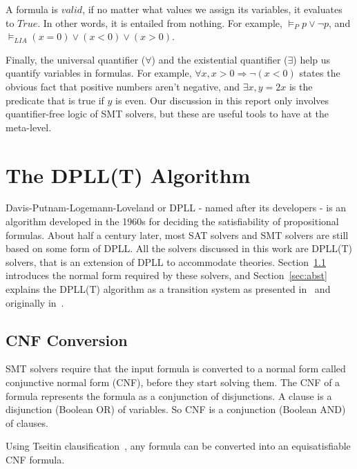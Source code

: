 \documentclass{article}
\begin{document}
A formula is $valid$, if no matter what values we assign its 
variables, it evaluates to $True$. In other words, it is
entailed from nothing. For example, $\models_P p \lor \neg p$, 
and $\models_{LIA} (x = 0) \lor (x < 0) \lor (x > 0)$.

Finally, the universal quantifier ($\forall$) and 
the existential quantifier ($\exists$) help us quantify 
variables in formulas. For example, $\forall x, x > 0 
\Rightarrow \neg (x < 0)$ states the obvious fact that 
positive numbers aren't negative, and $\exists x, y = 2x$ 
is the predicate that is true if $y$ is even. Our discussion 
in this report only involves quantifier-free logic of SMT 
solvers, but these are useful tools to have at the meta-level.


\section{The DPLL(T) Algorithm}
\label{sec:dpll}
Davis-Putnam-Logemann-Loveland or DPLL - named after its 
developers - is an algorithm developed in the 1960s 
for deciding the satisfiability of propositional formulas.
About half a century later, most SAT solvers and SMT solvers
are still based on some form of DPLL. All the solvers 
discussed in this work are DPLL(T) solvers, that is an 
extension of DPLL to accommodate theories. 
Section~\ref{sec:cnf}
introduces the normal form required by these solvers, 
and Section~\ref{sec:abst} explains the DPLL(T) algorithm as a 
transition system as presented 
in~\cite{DBLP:conf/fmcad/KatzBTRH16} and originally 
in~\cite{DBLP:journals/jacm/NieuwenhuisOT06}.

\subsection{CNF Conversion}
\label{sec:cnf}
SMT solvers require that the input formula is converted to a 
normal form called conjunctive normal form (CNF), before they 
start solving them. The CNF of a formula represents the 
formula as a conjunction of disjunctions. A clause is a 
disjunction (Boolean OR) of variables. So CNF is a 
conjunction (Boolean AND) of clauses. 

Using Tseitin clausification~\cite{BEL01Handbook}, any formula 
can be converted into an equisatisfiable CNF formula.
\end{document}
